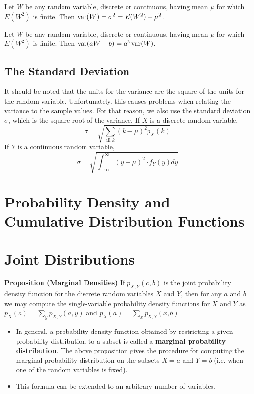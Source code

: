 Let $W$ be any random variable, discrete or continuous, having mean $\mu$ for which $E(W^2)$ is finite. Then $\operatorname{var}(W)=\sigma^2=E(W^2)-\mu^2$.

Let $W$ be any random variable, discrete or continuous, having mean $\mu$ for which $E(W^2)$ is finite. Then $\operatorname{var}(aW+b)=a^2\operatorname{var}(W)$.

\subsection{The Standard Deviation}

It should be noted that the units for the variance are the square of the units for the random variable. Unfortunately, this causes problems when relating the variance to the sample values. For that reason, we also use the standard deviation $\sigma$, which is the square root of the variance. If $X$ is a discrete random variable, $$\sigma = \sqrt{\sum_{\text{all } k} (k-\mu)^2 p_X(k)}$$ If $Y$ is a continuous random variable, $$\sigma = \sqrt{ \int_{-\infty}^{\infty} (y-\mu)^2 \cdot f_Y(y) dy}$$

\section{Probability Density and Cumulative Distribution Functions}


\section{Joint Distributions}

\textbf{Proposition (Marginal Densities)} If $p_{X,Y}(a,b)$ is the joint probability density function for the discrete random variables $X$ and $Y$, then for any $a$ and $b$ we may compute the single-variable probability density functions for $X$ and $Y$ as $p_X(a) = \sum_{y} p_{X,Y}(a,y)$ and $p_X(a) = \sum_{x} p_{X,Y}(x,b)$
\begin{itemize}
    \item In general, a probability density function obtained by restricting a given probability distribution to a subset is called a \textbf{marginal probability distribution}. The above proposition gives the procedure for computing the marginal probability distribution on the subsets $X = a$ and $Y = b$ (i.e. when one of the random variables is fixed).
    \item This formula can be extended to an arbitrary number of variables.
\end{itemize}

